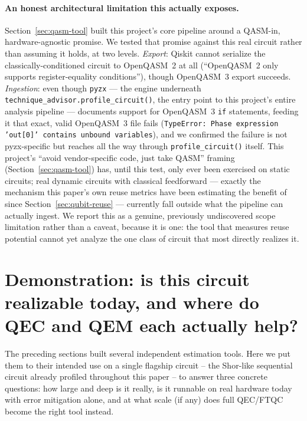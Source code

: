 \documentclass[9pt,twocolumn]{extarticle}
\begin{document}
\paragraph{An honest architectural limitation this actually exposes.} Section~\ref{sec:qasm-tool}
built this project's core pipeline around a QASM-in, hardware-agnostic
promise. We tested that promise against this real circuit rather than
assuming it holds, at two levels. \emph{Export}: Qiskit cannot serialize
the classically-conditioned circuit to OpenQASM~2 at all (``OpenQASM~2
only supports register-equality conditions''), though OpenQASM~3 export
succeeds. \emph{Ingestion}: even though \texttt{pyzx} --- the engine
underneath \texttt{technique\_advisor.profile\_circuit()}, the entry
point to this project's entire analysis pipeline --- documents support
for OpenQASM~3 \texttt{if} statements, feeding it that exact, valid
OpenQASM~3 file fails (\texttt{TypeError: Phase expression 'out[0]'
contains unbound variables}), and we confirmed the failure is not
pyzx-specific but reaches all the way through
\texttt{profile\_circuit()} itself. This project's ``avoid
vendor-specific code, just take QASM'' framing (Section~\ref{sec:qasm-tool})
has, until this test, only ever been exercised on static circuits; real
dynamic circuits with classical feedforward --- exactly the mechanism
this paper's own reuse metrics have been estimating the benefit of since
Section~\ref{sec:qubit-reuse} --- currently fall outside what the pipeline
can actually ingest. We report this as a genuine, previously undiscovered
scope limitation rather than a caveat, because it is one: the tool that
measures reuse potential cannot yet analyze the one class of circuit that
most directly realizes it.

\section{Demonstration: is this circuit realizable today, and where do QEC and QEM each actually help?}
\label{sec:flagship-demo}
The preceding sections built several independent estimation tools. Here we
put them to their intended use on a single flagship circuit -- the
Shor-like sequential circuit already profiled throughout this paper -- to
answer three concrete questions: how large and deep is it really, is it
runnable on real hardware today with error mitigation alone, and at what
scale (if any) does full QEC/FTQC become the right tool instead.
\end{document}

